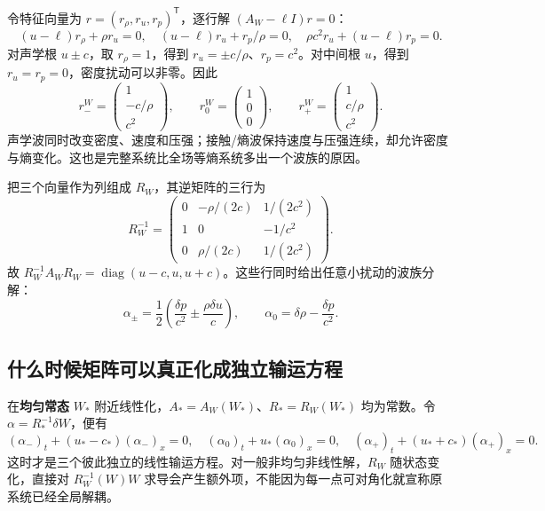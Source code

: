 令特征向量为 $r=(r_\rho,r_u,r_p)^{\mathsf T}$，逐行解 $(A_W-\ell I)r=0$：
\begin{equation}
 (u-\ell)r_\rho+\rho r_u=0,\quad
 (u-\ell)r_u+r_p/\rho=0,\quad
 \rho c^2r_u+(u-\ell)r_p=0.
\end{equation}
对声学根 $u\pm c$，取 $r_\rho=1$，得到 $r_u=\pm c/\rho$、$r_p=c^2$。对中间根 $u$，得到 $r_u=r_p=0$，密度扰动可以非零。因此
\begin{equation}
 r_-^W=\begin{pmatrix}1\\-c/\rho\\c^2\end{pmatrix},\qquad
 r_0^W=\begin{pmatrix}1\\0\\0\end{pmatrix},\qquad
 r_+^W=\begin{pmatrix}1\\c/\rho\\c^2\end{pmatrix}.
\end{equation}
声学波同时改变密度、速度和压强；接触/熵波保持速度与压强连续，却允许密度与熵变化。这也是完整系统比全场等熵系统多出一个波族的原因。

把三个向量作为列组成 $R_W$，其逆矩阵的三行为
\begin{equation}
 R_W^{-1}=\begin{pmatrix}
 0&-\rho/(2c)&1/(2c^2)\\
 1&0&-1/c^2\\
 0&\rho/(2c)&1/(2c^2)
 \end{pmatrix}.
\end{equation}
故 $R_W^{-1}A_WR_W=\operatorname{diag}(u-c,u,u+c)$。这些行同时给出任意小扰动的波族分解：
\begin{equation}
 \alpha_\pm=\frac12\left(\frac{\delta p}{c^2}\pm\frac{\rho\delta u}{c}\right),
 \qquad\alpha_0=\delta\rho-\frac{\delta p}{c^2}.
\end{equation}

\subsection{什么时候矩阵可以真正化成独立输运方程}

在\textbf{均匀常态} $W_*$ 附近线性化，$A_*=A_W(W_*)$、$R_*=R_W(W_*)$ 均为常数。令 $\alpha=R_*^{-1}\delta W$，便有
\begin{equation}
 (\alpha_-)_t+(u_*-c_*)(\alpha_-)_x=0,\quad
 (\alpha_0)_t+u_*(\alpha_0)_x=0,\quad
 (\alpha_+)_t+(u_*+c_*)(\alpha_+)_x=0.
\end{equation}
这时才是三个彼此独立的线性输运方程。对一般非均匀非线性解，$R_W$ 随状态变化，直接对 $R_W^{-1}(W)W$ 求导会产生额外项，不能因为每一点可对角化就宣称原系统已经全局解耦。

